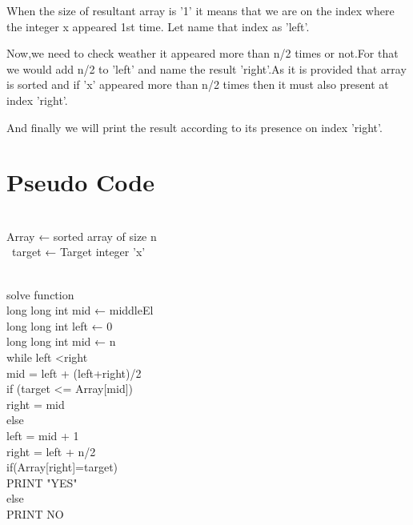\documentclass[conference]{IEEEtran}
\begin{document}
When the size of resultant array is '1' it means that we are on the index where the integer x appeared 1st time. 
Let name that index as 'left'.

Now,we need to check weather it appeared more than n/2 times or not.For that we would add n/2 to 'left' and name the result 'right'.As it is provided that array is sorted and if 'x' appeared more than n/2 times then it must also present at index 'right'.

And finally we will print the result according to its presence on index 'right'.



\section{Pseudo Code}
\\

   Array ← sorted array of size n\\\
   target ← Target integer 'x' \\\
   
   solve function  \\
   \indent
   \hspace{0.5 cm}
    long long int mid ← middleEl  \\
    \indent \hspace{0.5 cm}
    long long int left ← 0  \\
    \indent \hspace{0.5 cm}
    long long int mid ← n  \\
    \indent \hspace {0.5cm}
    while left \textless right  \\
    \indent \hspace{1cm}
        mid = left + (left+right)/2  \\
        \indent \hspace{1cm}
        if (target \textless= Array[mid]) \\ 
        \indent \hspace{1.5 cm} right = mid \\ 
        \indent \hspace{1cm}
        else \\
        \indent \hspace{1.5 cm} left = mid + 1\\
        
    \indent \hspace {0.5cm} right = left + n/2 \\
    \indent \hspace {0.5cm} if(Array[right]=target) \\
    \indent \hspace{1cm} PRINT "YES" \\
    \indent \hspace {0.5cm} else \\
    \indent \hspace{1cm} PRINT NO \\  
    
\end{document}
